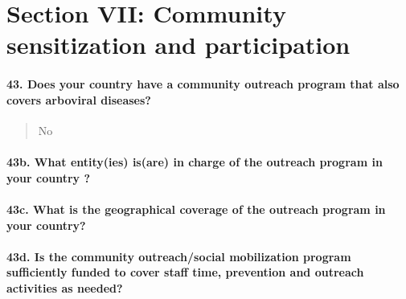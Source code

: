 \documentclass[
]{article}
\begin{document}
\hypertarget{section-vii-community-sensitization-and-participation}{%
\section{Section VII: Community sensitization and
participation}\label{section-vii-community-sensitization-and-participation}}

\hypertarget{does-your-country-have-a-community-outreach-program-that-also-covers-arboviral-diseases}{%
\paragraph{43. Does your country have a community outreach program that
also covers arboviral
diseases?}\label{does-your-country-have-a-community-outreach-program-that-also-covers-arboviral-diseases}}

\begin{quote}
No
\end{quote}

\hypertarget{b.-what-entityies-isare-in-charge-of-the-outreach-program-in-your-country}{%
\paragraph{43b. What entity(ies) is(are) in charge of the outreach
program in your country
?}\label{b.-what-entityies-isare-in-charge-of-the-outreach-program-in-your-country}}

\begin{quote}
\end{quote}

\hypertarget{c.-what-is-the-geographical-coverage-of-the-outreach-program-in-your-country}{%
\paragraph{43c. What is the geographical coverage of the outreach
program in your
country?}\label{c.-what-is-the-geographical-coverage-of-the-outreach-program-in-your-country}}

\begin{quote}
\end{quote}

\hypertarget{d.-is-the-community-outreachsocial-mobilization-program-sufficiently-funded-to-cover-staff-time-prevention-and-outreach-activities-as-needed}{%
\paragraph{43d. Is the community outreach/social mobilization program
sufficiently funded to cover staff time, prevention and outreach
activities as
needed?}\label{d.-is-the-community-outreachsocial-mobilization-program-sufficiently-funded-to-cover-staff-time-prevention-and-outreach-activities-as-needed}}
\end{document}
